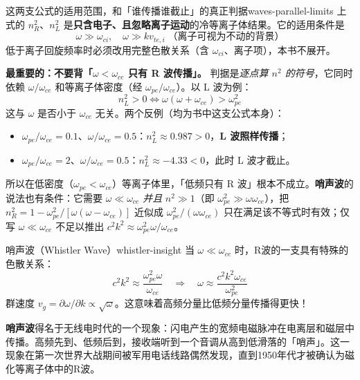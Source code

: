 \documentclass[12pt,a4paper,openany,oneside]{book}
\begin{document}
\begin{warning}{这两支公式的适用范围，和「谁传播谁截止」的真正判据}{waves-parallel-limits}
上式的 $n_R^2$、$n_L^2$ 是\textbf{只含电子、且忽略离子运动}的冷等离子体结果。它的适用条件是
\[
\omega \gg \omega_{ci}, \quad \omega \gg k v_{te,i}\;\text{（离子可视为不动的背景）}
\]
低于离子回旋频率时必须改用完整色散关系（含 $\omega_{ci}$、离子项），本书不展开。

\textbf{最重要的：不要背「$\omega<\omega_{ce}$ 只有 R 波传播」。} 判据是\emph{逐点算 $n^2$ 的符号}，它同时依赖 $\omega/\omega_{ce}$ 和等离子体密度（经 $\omega_{pe}/\omega_{ce}$）。以 L 波为例：
\[
n_L^2 > 0 \iff \omega(\omega+\omega_{ce}) > \omega_{pe}^2
\]
这与 $\omega$ 是否小于 $\omega_{ce}$ 无关。两个反例（均为书中这支公式本身）：
\begin{itemize}
\item $\omega_{pe}/\omega_{ce}=0.1$、$\omega/\omega_{ce}=0.5$：$n_L^2\approx0.987>0$，\textbf{L 波照样传播}；
\item $\omega_{pe}/\omega_{ce}=2$、$\omega/\omega_{ce}=0.5$：$n_L^2\approx-4.33<0$，此时 L 波才截止。
\end{itemize}
所以在低密度（$\omega_{pe}<\omega_{ce}$）等离子体里，「低频只有 R 波」根本不成立。\textbf{哨声波}的说法也有条件：它需要 $\omega\ll\omega_{ce}$ \emph{并且} $n^2\gg1$（即 $\omega_{pe}^2\gg\omega\omega_{ce}$），把 $n_R^2=1-\omega_{pe}^2/[\omega(\omega-\omega_{ce})]$ 近似成 $\omega_{pe}^2/(\omega\omega_{ce})$ 只在满足该不等式时有效；仅写 $\omega\ll\omega_{ce}$ 不足以推出 $c^2k^2\approx\omega_{pe}^2\omega/\omega_{ce}$。
\end{warning}

\begin{insight}{哨声波（Whistler Wave）}{whistler-insight}
当 $\omega \ll \omega_{ce}$ 时，R波的一支具有特殊的色散关系：
\[
c^2 k^2 \approx \frac{\omega_{pe}^2 \omega}{\omega_{ce}}
\quad\Rightarrow\quad
\omega \approx \frac{c^2 k^2 \omega_{ce}}{\omega_{pe}^2}
\]
群速度 $v_g = \partial\omega/\partial k \propto \sqrt{\omega}$。这意味着高频分量比低频分量传播得更快！

\textbf{哨声波}得名于无线电时代的一个现象：闪电产生的宽频电磁脉冲在电离层和磁层中传播。高频先到、低频后到，接收端听到一个音调从高到低滑落的「哨声」。这一现象在第一次世界大战期间被军用电话线路偶然发现，直到1950年代才被确认为磁化等离子体中的R波。
\end{insight}
\end{document}
